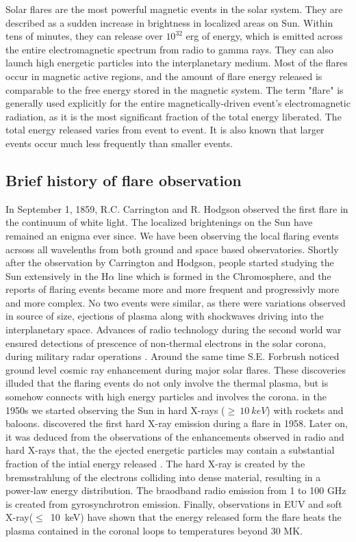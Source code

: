 Solar flares are the most powerful magnetic events in the solar system. They are described as a sudden increase in brightness in localized areas on Sun. Within tens of minutes, they can release over $10^{32}$ erg of energy, which is emitted across the entire electromagnetic spectrum from radio to gamma rays. They can also launch high energetic particles into the interplanetary medium. Most of the flares occur in magnetic active regions, and the amount of flare energy released is comparable to the free energy stored in the magnetic system. The term "flare" is generally used explicitly for the entire magnetically-driven event's electromagnetic radiation, as it is the most significant fraction of the total energy liberated. The total energy released varies from event to event. It is also known that larger events occur much less frequently than smaller events.

\subsection{Brief history of flare observation}\label{sol_flr_1}

In September 1, 1859, R.C. Carrington and R. Hodgson observed the first flare in the continuum of white light\citep{carrington1859,hodgson1859}. The localized brightenings on the Sun have remained an enigma ever since. We have been observing the local flaring events acrsoss all wavelenths from both ground and space based observatories.  Shortly after the observation by Carrington and Hodgson, people started studying the Sun extensively in the H$\alpha$ line which is formed in the Chromosphere, and the reports of flaring events became more and more frequent and progressivly more and more complex. No two events were similar, as there were variations observed in source of size, ejections of plasma along with shockwaves driving into the interplanetary space. Advances of radio technology during the second world war ensured detections of prescence of non-thermal electrons in the solar corona, during military radar operations \citep{hey46}. Around the same time S.E. Forbrush noticed ground level cosmic ray enhancement during major solar flares. These discoveries illuded that the flaring events do not only involve the thermal plasma, but is somehow connects with high energy particles and involves the corona. in the 1950s we started observing the Sun in hard X-rays ($\ge~10~keV$) with rockets and baloons. \cite{peterson59} discovered the first hard X-ray emission during a flare in 1958. Later on, it was deduced from the observations of the enhancements observed in radio and hard X-rays that, the the ejected energetic particles may contain a substantial fraction of the intial energy released \citep{brown71}. The hard X-ray is created by the bremsstrahlung of the electrons colliding into dense material, resulting in a power-law energy distribution. The braodband radio emission from 1 to 100 GHz is created from gyrosynchrotron emission. Finally, observations in EUV and soft X-ray($\le$~10~keV) have shown that the energy released form the flare heats the plasma contained in the coronal loops to temperatures beyond 30 MK. 

